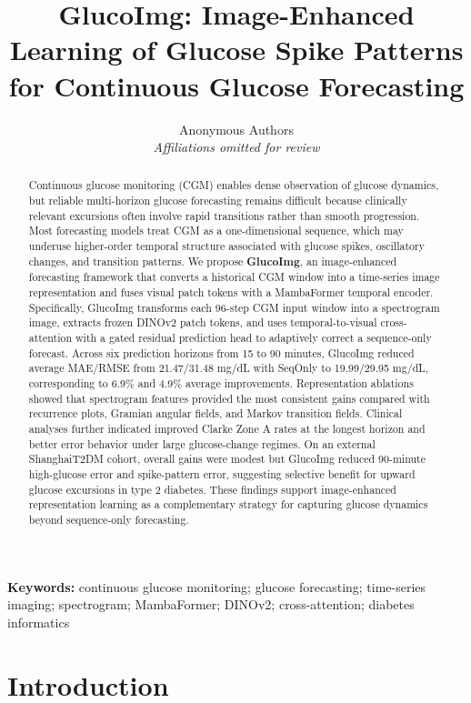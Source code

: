 \documentclass[11pt]{article}
\title{GlucoImg: Image-Enhanced Learning of Glucose Spike Patterns for Continuous Glucose Forecasting}
\author{
  Anonymous Authors\\
  \textit{Affiliations omitted for review}
}
\date{}
\begin{document}
\maketitle

\begin{abstract}
Continuous glucose monitoring (CGM) enables dense observation of glucose dynamics, but reliable multi-horizon glucose forecasting remains difficult because clinically relevant excursions often involve rapid transitions rather than smooth progression. Most forecasting models treat CGM as a one-dimensional sequence, which may underuse higher-order temporal structure associated with glucose spikes, oscillatory changes, and transition patterns. We propose \textbf{GlucoImg}, an image-enhanced forecasting framework that converts a historical CGM window into a time-series image representation and fuses visual patch tokens with a MambaFormer temporal encoder. Specifically, GlucoImg transforms each 96-step CGM input window into a spectrogram image, extracts frozen DINOv2 patch tokens, and uses temporal-to-visual cross-attention with a gated residual prediction head to adaptively correct a sequence-only forecast. Across six prediction horizons from 15 to 90 minutes, GlucoImg reduced average MAE/RMSE from 21.47/31.48 mg/dL with SeqOnly to 19.99/29.95 mg/dL, corresponding to 6.9\% and 4.9\% average improvements. Representation ablations showed that spectrogram features provided the most consistent gains compared with recurrence plots, Gramian angular fields, and Markov transition fields. Clinical analyses further indicated improved Clarke Zone A rates at the longest horizon and better error behavior under large glucose-change regimes. On an external ShanghaiT2DM cohort, overall gains were modest but GlucoImg reduced 90-minute high-glucose error and spike-pattern error, suggesting selective benefit for upward glucose excursions in type 2 diabetes. These findings support image-enhanced representation learning as a complementary strategy for capturing glucose dynamics beyond sequence-only forecasting.
\end{abstract}

\noindent\textbf{Keywords:} continuous glucose monitoring; glucose forecasting; time-series imaging; spectrogram; MambaFormer; DINOv2; cross-attention; diabetes informatics

\section{Introduction}
\end{document}
